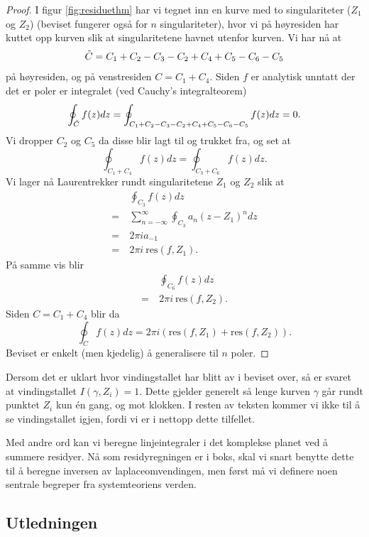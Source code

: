 \documentclass{article}
\begin{document}
\begin{proof}
    I figur \ref{fig:residuethm} har vi tegnet inn en kurve med to singulariteter ($Z_1$ og $Z_2$) (beviset fungerer også for $n$ singulariteter), hvor vi på høyresiden har kuttet opp kurven slik at singularitetene havnet utenfor kurven. Vi har nå at 
    \[
        \Tilde{C} = C_1 + C_2 - C_3 - C_2 + C_4 + C_5 - C_6 - C_5
    \]
    på høyresiden, og på venstresiden $C = C_1 + C_4$. Siden $f$ er analytisk unntatt der det er poler er integralet (ved Cauchy's integralteorem)
    \[
        \oint_{\Tilde{C}} f(z) dz = \oint_{C_1 + C_2 - C_3 -C_2 + C_4 + C_5 - C_6 - C_5} f(z) dz = 0.
    \]
    Vi dropper $C_2$ og $C_5$ da disse blir lagt til og trukket fra, og set at
    \[
    \oint_{C_1 + C_4} f(z) dz = \oint_{C_3 + C_6} f(z) dz.
    \]
    Vi lager nå Laurentrekker rundt singularitetene $Z_1$ og $Z_2$ slik at 
    \begin{align}
        & \oint_{C_3} f(z) dz \\
        =\ & \sum_{n=-\infty}^{\infty} \oint_{C_3} a_n (z - Z_1)^n dz \\ 
        =\ & 2\pi i a_{-1} \\ 
        =\ & 2\pi i \ \mathrm{res}(f, Z_1).
    \end{align}
    På samme vis blir
    \begin{align}
        & \oint_{C_6} f(z) dz \\
        =\ & 2\pi i \ \mathrm{res}(f, Z_2).
    \end{align}
    Siden $C = C_1 + C_4$ blir da 
    \[
        \oint_C f(z) dz = 2\pi i (\mathrm{res}(f, Z_1) + \mathrm{res}(f, Z_2)).
    \]
    Beviset er enkelt (men kjedelig) å generalisere til $n$ poler.
\end{proof}

Dersom det er uklart hvor vindingstallet har blitt av i beviset over, så er svaret at vindingstallet $I(\gamma, Z_i) = 1$. Dette gjelder generelt så lenge kurven $\gamma$ går rundt punktet $Z_i$ kun én gang, og mot klokken. I resten av teksten kommer vi ikke til å se vindingstallet igjen, fordi vi er i nettopp dette tilfellet.

Med andre ord kan vi beregne linjeintegraler i det komplekse planet ved å summere residyer. Nå som residyregningen er i boks, skal vi snart benytte dette til å beregne inversen av laplaceomvendingen, men først må vi definere noen sentrale begreper fra systemteoriens verden.

\subsection{Utledningen}
\end{document}
